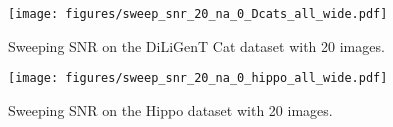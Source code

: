 \begin{figure*}
\centering
\begin{minipage}{0.46\textwidth}
\texttt{[image: figures/sweep\_snr\_20\_na\_0\_Dcats\_all\_wide.pdf]}
\caption{Sweeping SNR on the DiLiGenT Cat \cite{shi2016} dataset with 20 images.}
\label{fig:sweep_snr_20_na_0_Dcats_all}
\end{minipage}
\quad 
\begin{minipage}{0.46\textwidth}
\texttt{[image: figures/sweep\_snr\_20\_na\_0\_hippo\_all\_wide.pdf]}
\caption{Sweeping SNR on the Hippo dataset \cite{xiong2015shading} with 20 images.}
\label{fig:sweep_snr_20_na_0_hippo_all}
\end{minipage}

\vspace{2mm}


\end{figure*}

